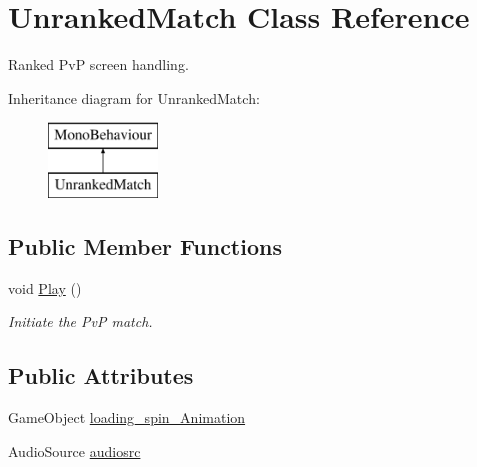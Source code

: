 \hypertarget{class_unranked_match}{}\section{Unranked\+Match Class Reference}
\label{class_unranked_match}


Ranked PvP screen handling.  


Inheritance diagram for Unranked\+Match\+:\begin{figure}[H]
\begin{center}
\leavevmode
\includegraphics[height=2.000000cm]{class_unranked_match}
\end{center}
\end{figure}
\subsection*{Public Member Functions}
\begin{DoxyCompactItemize}
\item 
void \mbox{\hyperlink{class_unranked_match_afce2d9b096ad7e07913e6e574055083e}{Play}} ()
\begin{DoxyCompactList}\small\item\em Initiate the PvP match. \end{DoxyCompactList}\end{DoxyCompactItemize}
\subsection*{Public Attributes}
\begin{DoxyCompactItemize}
\item 
Game\+Object \mbox{\hyperlink{class_unranked_match_acf7f9186ee313f3bc5cabb097eb41e37}{loading\+\_\+spin\+\_\+\+Animation}}
\item 
Audio\+Source \mbox{\hyperlink{class_unranked_match_a467346b77a8d2cbe87bdbdc6a99809b0}{audiosrc}}
\end{DoxyCompactItemize}
